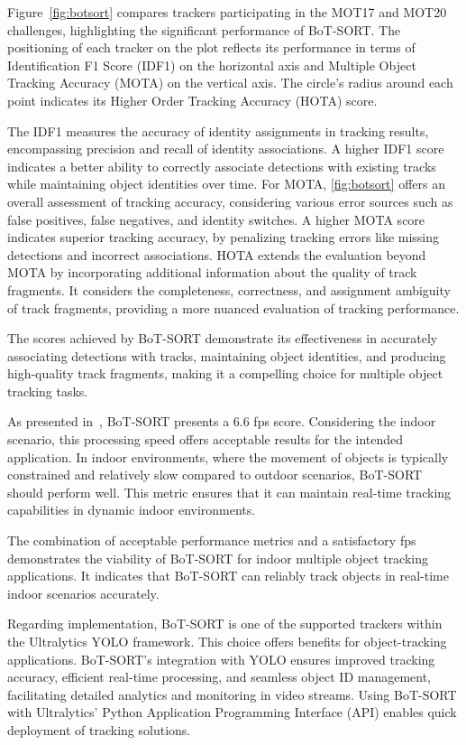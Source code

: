 Figure~\ref{fig:botsort} compares trackers participating in the MOT17 and MOT20 challenges, highlighting the significant performance of BoT-SORT. The positioning of each tracker on the plot reflects its performance in terms of Identification F1 Score (IDF1) on the horizontal axis and Multiple Object Tracking Accuracy (MOTA) on the vertical axis.
The circle's radius around each point indicates its Higher Order Tracking Accuracy (HOTA) score.

The IDF1 measures the accuracy of identity assignments in tracking results, encompassing precision and recall of identity associations.
A higher IDF1 score indicates a better ability to correctly associate detections with existing tracks while maintaining object identities over time.
For MOTA, \ref{fig:botsort} offers an overall assessment of tracking accuracy, considering various error sources such as false positives, false negatives, and identity switches.
A higher MOTA score indicates superior tracking accuracy, by penalizing tracking errors like missing detections and incorrect associations.
HOTA extends the evaluation beyond MOTA by incorporating additional information about the quality of track fragments.
 It considers the completeness, correctness, and assignment ambiguity of track fragments, providing a more nuanced evaluation of tracking performance.

The scores achieved by BoT-SORT demonstrate its effectiveness in accurately associating detections with tracks, maintaining object identities, and producing high-quality track fragments, making it a compelling choice for multiple object tracking tasks.

As presented in~\cite{botsort}, BoT-SORT presents a 6.6 fps score.
Considering the indoor scenario, this processing speed offers acceptable results for the intended application.
In indoor environments, where the movement of objects is typically constrained and relatively slow compared to outdoor scenarios, BoT-SORT should perform well.
This metric ensures that it can maintain real-time tracking capabilities in dynamic indoor environments.

The combination of acceptable performance metrics and a satisfactory fps demonstrates the viability of BoT-SORT for indoor multiple object tracking applications.
It indicates that BoT-SORT can reliably track objects in real-time indoor scenarios accurately.

Regarding implementation, BoT-SORT is one of the supported trackers within the Ultralytics YOLO framework.
This choice offers benefits for object-tracking applications.
BoT-SORT's integration with YOLO ensures improved tracking accuracy, efficient real-time processing, and seamless object ID management, facilitating detailed analytics and monitoring in video streams.
Using BoT-SORT with Ultralytics' Python Application Programming Interface (API) enables quick deployment of tracking solutions.

